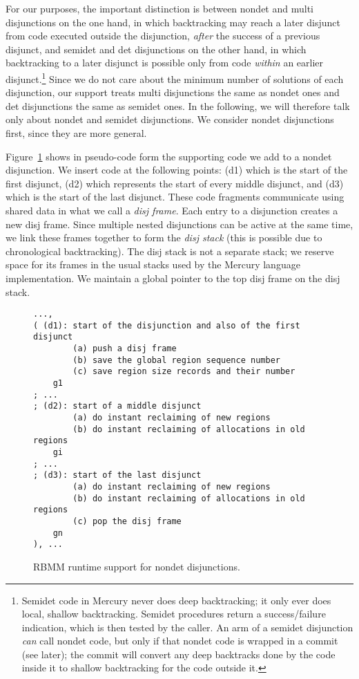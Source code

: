 \documentclass{tlp}
\begin{document}
For our purposes, the important distinction is between
nondet and multi disjunctions on the one hand,
in which backtracking may reach a later disjunct
from code executed outside the disjunction,
\emph{after} the success of a previous disjunct,
and semidet and det disjunctions on the other hand,
in which backtracking to a later disjunct
is possible only from code \emph{within} an earlier disjunct.\footnote{
Semidet code in Mercury never does deep backtracking;
it only ever does local, shallow backtracking.
Semidet procedures return a success/failure indication,
which is then tested by the caller.
An arm of a semidet disjunction \emph{can} call nondet code,
but only if that nondet code is wrapped in a commit (see later);
the commit will convert any deep backtracks done by the code inside it
to shallow backtracking for the code outside it.
}
Since we do not care about the minimum number of solutions of each disjunction,
our support treats multi disjunctions the same as nondet ones
and det disjunctions the same as semidet ones.
In the following,
we will therefore talk only about nondet and semidet disjunctions.
We consider nondet disjunctions first, since they are more general.

Figure~\ref{fig:supportdisj} shows in pseudo-code form
the supporting code we add to a nondet disjunction.
We insert code at the following points:
(d1) which is the start of the first disjunct,
(d2) which represents the start of every middle disjunct,
and (d3) which is the start of the last disjunct.
These code fragments communicate
using shared data in what we call a \emph{disj frame}.
Each entry to a disjunction creates a new disj frame.
Since multiple nested disjunctions can be active at the same time,
we link these frames together to form the \emph{disj stack}
(this is possible due to chronological backtracking).
The disj stack is not a separate stack;
we reserve space for its frames
in the usual stacks used by the Mercury language implementation.
We maintain a global pointer to the top disj frame on the disj stack.

\begin{figure}[tb]
\scriptsize
\begin{Verbatim}[frame=single,framerule=0.2pt,framesep=3pt]
...,
( (d1): start of the disjunction and also of the first disjunct
        (a) push a disj frame
        (b) save the global region sequence number
        (c) save region size records and their number
    g1
; ...
; (d2): start of a middle disjunct
        (a) do instant reclaiming of new regions
        (b) do instant reclaiming of allocations in old regions
    gi
; ...
; (d3): start of the last disjunct
        (a) do instant reclaiming of new regions
        (b) do instant reclaiming of allocations in old regions
        (c) pop the disj frame
    gn
), ...
\end{Verbatim}
\small
\caption{RBMM runtime support for nondet disjunctions.}
\label{fig:supportdisj}
\normalsize
\end{figure}
\end{document}
